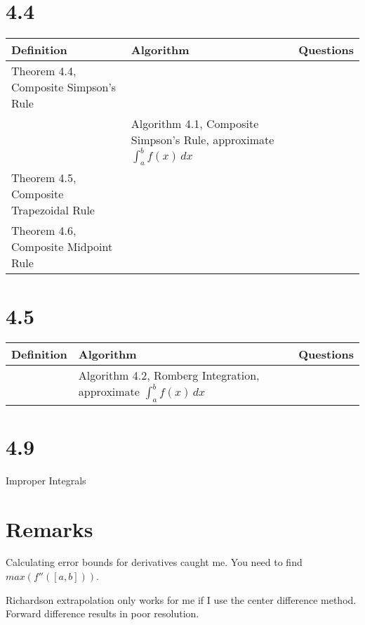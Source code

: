 \documentclass{article}
\begin{document}
\section*{4.4}

\begin{tabularx}{\textwidth}{ |X|X|c| }
    \hline
	{\bf Definition} & {\bf Algorithm} & {\bf Questions} \\
    \hline
	Theorem 4.4, Composite Simpson's Rule & & \\
    \hline
	 & Algorithm 4.1, Composite Simpson's Rule, approximate $\int_a^b f(x) \, dx$ & \\
    \hline
	Theorem 4.5, Composite Trapezoidal Rule & & \\
    \hline
	Theorem 4.6, Composite Midpoint Rule & & \\
    \hline
\end{tabularx}

\section*{4.5}

\begin{tabularx}{\textwidth}{ |c|X|c| }
    \hline
	{\bf Definition} & {\bf Algorithm} & {\bf Questions} \\
    \hline
	 & Algorithm 4.2, Romberg Integration, approximate $\int_a^b f(x) \, dx$ & \\
    \hline
\end{tabularx}

\section*{4.9}

Improper Integrals

\section*{Remarks}

Calculating error bounds for derivatives caught me.
You need to find $max(f''([a,b]))$.

Richardson extrapolation only works for me if I use the center difference method.
Forward difference results in poor resolution.
\end{document}
